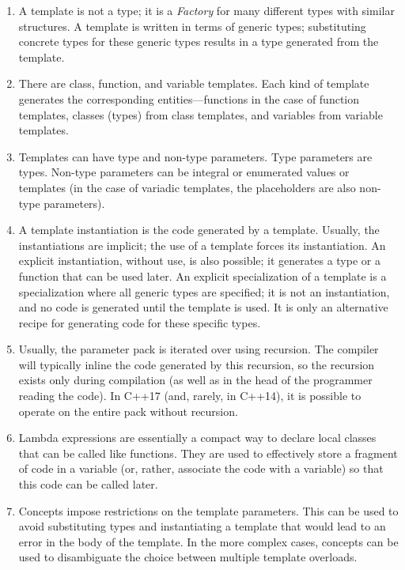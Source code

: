 \begin{enumerate}
\item
  A template is not a type; it is a \emph{Factory} for many different types with similar structures. A template is written in terms of generic types; substituting concrete types for these generic types results in a type generated from the template.
\item
  There are class, function, and variable templates. Each kind of template generates the corresponding entities---functions in the case of function templates, classes (types) from class templates, and variables from variable templates.
\item
  Templates can have type and non-type parameters. Type parameters are types. Non-type parameters can be integral or enumerated values or templates (in the case of variadic templates, the placeholders are also non-type parameters).
\item
  A template instantiation is the code generated by a template. Usually, the instantiations are implicit; the use of a template forces its instantiation. An explicit instantiation, without use, is also possible; it generates a type or a function that can be used later. An explicit specialization of a template is a specialization where all generic types are specified; it is not an instantiation, and no code is generated until the template is used. It is only an alternative recipe for generating code for these specific types.
\item
  Usually, the parameter pack is iterated over using recursion. The compiler will typically inline the code generated by this recursion, so the recursion exists only during compilation (as well as in the head of the programmer reading the code). In C++17 (and, rarely, in C++14), it is possible to operate on the entire pack without recursion.
\item
  Lambda expressions are essentially a compact way to declare local classes that can be called like functions. They are used to effectively store a fragment of code in a variable (or, rather, associate the code with a variable) so that this code can be called later.
\item
  Concepts impose restrictions on the template parameters. This can be used to avoid substituting types and instantiating a template that would lead to an error in the body of the template. In the more complex cases, concepts can be used to disambiguate the choice between multiple template overloads.
\end{enumerate}

